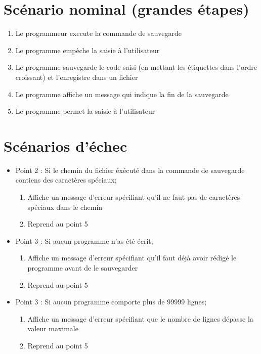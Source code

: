 \documentclass[12pt,a4paper]{article}
\begin{document}
        \section{Scénario nominal (grandes étapes)}
        \begin{enumerate}
        	\item Le programmeur execute la commande de sauvegarde
        	\item Le programme empèche la saisie à l'utilisateur
        	\item Le programme sauvegarde le code saisi (en mettant les étiquettes dans l'ordre croissant) et l'enregistre dans un fichier
        	\item Le programme affiche un message qui indique la fin de la sauvegarde
        	\item Le programme permet la saisie à l'utilisateur
    	\end{enumerate}

        \section{Scénarios d'échec}
        \begin{itemize}
        	\item Point 2 : Si le chemin du fichier éxécuté dans la commande de sauvegarde contiens des caractères spéciaux;
        	\begin{enumerate}
        		\item Affiche un message d'erreur spécifiant qu'il ne faut pas de caractères spéciaux dans le chemin
        		\item Reprend au point 5
        	\end{enumerate}

        	\item Point 3 : Si aucun programme n'as été écrit;
        	\begin{enumerate}
        		\item Affiche un message d'erreur spécifiant qu'il faut déjà avoir rédigé le programme avant de le sauvegarder
        		\item Reprend au point 5
        	\end{enumerate}

           \item Point 3 : Si aucun programme comporte plus de 99999 lignes;
        	\begin{enumerate}
        		\item Affiche un message d'erreur spécifiant que le nombre de lignes dépasse la valeur maximale
        		\item Reprend au point 5
        	\end{enumerate}
    	\end{itemize}

    
\end{document}
